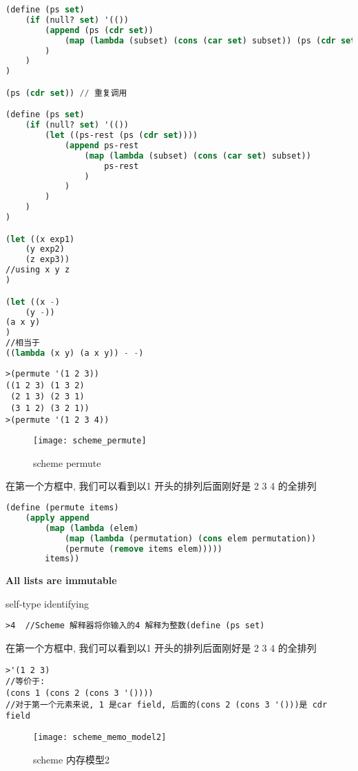 \documentclass{article}
\begin{document}
\begin{lstlisting}[language = Lisp]
(define (ps set)
	(if (null? set) '(())
		(append (ps (cdr set))
			(map (lambda (subset) (cons (car set) subset)) (ps (cdr set)))
		)
	)
)

(ps (cdr set)) // 重复调用

(define (ps set)
	(if (null? set) '(())
		(let ((ps-rest (ps (cdr set))))
			(append ps-rest
				(map (lambda (subset) (cons (car set) subset))
					ps-rest
				)
			)
		)
	)
)

(let ((x exp1)
	(y exp2)
	(z exp3))
//using x y z
)

(let ((x -)
	(y -))
(a x y)
)
//相当于
((lambda (x y) (a x y)) - -)
\end{lstlisting}

\begin{verbatim}
>(permute '(1 2 3))
((1 2 3) (1 3 2)
 (2 1 3) (2 3 1)
 (3 1 2) (3 2 1))
>(permute '(1 2 3 4))
\end{verbatim}
\begin{figure}[htbp]
	\centering
	\texttt{[image: scheme\_permute]}\\
	\caption{scheme permute}\label{fig.scheme.permute}
\end{figure}

在第一个方框中, 我们可以看到以1 开头的排列后面刚好是 2 3 4 的全排列

\begin{lstlisting}[language = Lisp]
(define (permute items)
	(apply append
		(map (lambda (elem)
			(map (lambda (permutation) (cons elem permutation))
			(permute (remove items elem)))))
		items))
\end{lstlisting}

\textbf{All lists are immutable}

self-type identifying
\begin{verbatim}
>4  //Scheme 解释器将你输入的4 解释为整数(define (ps set)
\end{verbatim}
在第一个方框中, 我们可以看到以1 开头的排列后面刚好是 2 3 4 的全排列

\begin{verbatim}
>'(1 2 3)
//等价于:
(cons 1 (cons 2 (cons 3 '())))
//对于第一个元素来说, 1 是car field, 后面的(cons 2 (cons 3 '()))是 cdr field
\end{verbatim}
\begin{figure}[htbp]
	\centering
	\texttt{[image: scheme\_memo\_model2]}\\
	\caption{scheme 内存模型2}\label{fig.scheme.memo.model2}
\end{figure}
\end{document}
